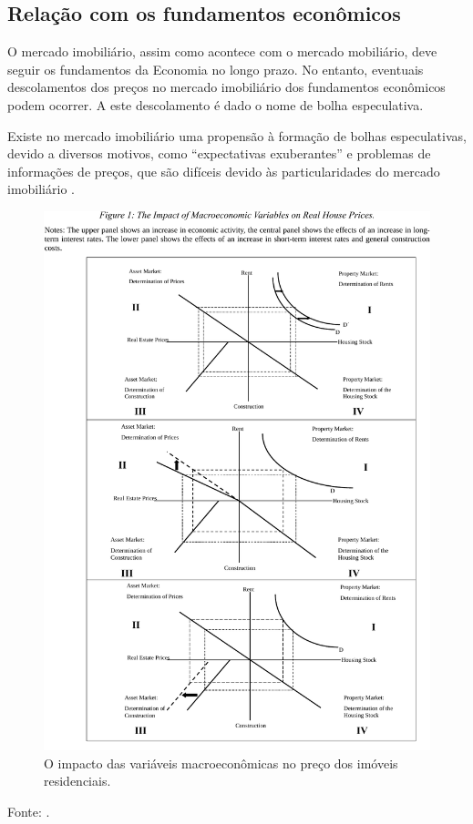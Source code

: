 \documentclass[
	12pt,				%
	oneside,			%
	a4paper,			%
	chapter=TITLE,		%
	section=TITLE,		%
	english,			%
	brazil				%
	]{abntex2}
\newcommand{\bcenter}{\begin{center}}
\newcommand{\ecenter}{\end{center}}
\begin{document}
\subsection{Relação com os fundamentos
econômicos}\label{relauxe7uxe3o-com-os-fundamentos-econuxf4micos}

O mercado imobiliário, assim como acontece com o mercado mobiliário,
deve seguir os fundamentos da Economia no longo prazo. No entanto,
eventuais descolamentos dos preços no mercado imobiliário dos
fundamentos econômicos podem ocorrer. A este descolamento é dado o nome
de bolha especulativa.

Existe no mercado imobiliário uma propensão à formação de bolhas
especulativas, devido a diversos motivos, como ``expectativas
exuberantes'' e problemas de informações de preços, que são difíceis
devido às particularidades do mercado imobiliário
\autocite[3]{ADAMS201038}.
\begin{figure}[H]

{\centering \includegraphics[width=\textwidth]{./images/adams_crop} 

}

\caption{O impacto das variáveis macroeconômicas no preço dos imóveis residenciais.}\label{fig:adams}
\end{figure}
\bcenter
Fonte: \textcite{ADAMS201038}. \ecenter
\end{document}

